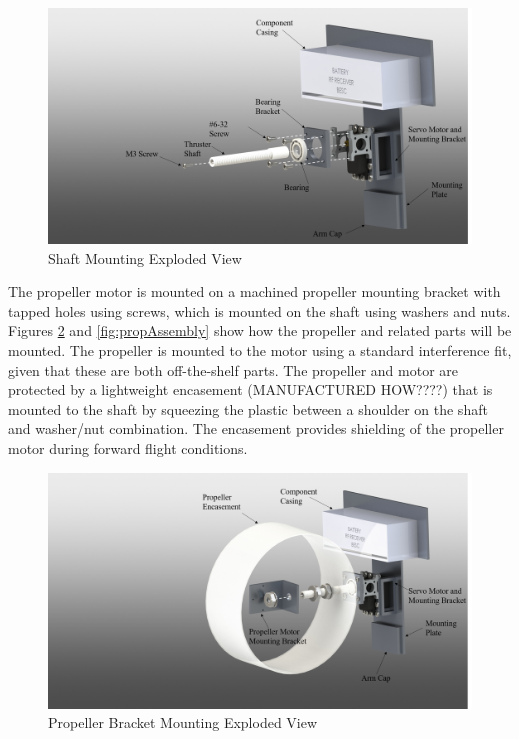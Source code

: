 \documentclass[../main.tex]{subfiles}
\begin{document}
  \begin{figure}[H]
 	\centering
 	\includegraphics[width=.8\linewidth]{img/design/thruster/shaftAssembly.png}
 	\caption{Shaft Mounting Exploded View}
 	\label{fig:shaftAssembly}
 \end{figure}
 
The propeller motor is mounted on a machined propeller mounting bracket with tapped holes using screws, which is mounted on the shaft using washers and nuts. Figures \ref{fig:mountAssembly} and \ref{fig:propAssembly} show how the propeller and related parts will be mounted. The propeller is mounted to the motor using a standard interference fit, given that these are both off-the-shelf parts. The propeller and motor are protected by a lightweight encasement (MANUFACTURED HOW????) that is mounted to the shaft by squeezing the plastic between a shoulder on the shaft and washer/nut combination. The encasement provides shielding of the propeller motor during forward flight conditions.\\

 \begin{figure}[H]
	\centering
	\includegraphics[width=.8\linewidth]{img/design/thruster/mountAssembly.png}
	\caption{Propeller Bracket Mounting Exploded View}
	\label{fig:mountAssembly}
\end{figure}
\end{document}
